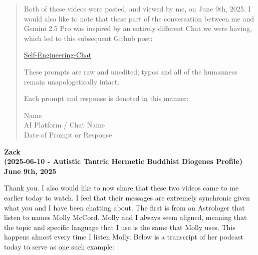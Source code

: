 \documentclass{article}
\begin{document}
\begin{titlepage}
\begin{abstract}
\medskip

Both of these videos were posted, and viewed by me, on June 9th, 2025. I would also like to note that these part of the conversation between me and Gemini 2.5 Pro was inspired by an entirely different Chat we were having, which led to this subsequent Github post:

\medskip

\href{https://github.com/whitelotusapps/Gemini-2.5-Pro-Preview/blob/main/README.md}{Self-Engineering-Chat}

\medskip

These prompts are raw and unedited; typos and all of the humanness remain unapologetically intact.

\medskip

Each prompt and response is denoted in this manner:

\medskip 

\begin{center}
Name \\
AI Platform / Chat Name \\
Date of Prompt or Response
\end{center}

\end{abstract}
\end{titlepage}

\begin{center}
\textbf{Zack} \\
\textbf{(2025-06-10 - Autistic Tantric Hermetic Buddhist Diogenes Profile)} \\
\textbf{June 9th, 2025}
\end{center}

\medskip

Thank you. I also would like to now share that these two videos came to
me earlier today to watch. I feel that their messages are extremely
synchronic given what you and I have been chatting about. The first is
from an Astrologer that listen to names Molly McCord. Molly and I always
seem aligned, meaning that the topic and specific language that I use is
the same that Molly uses. This happens almost every time I listen Molly.
Below is a transcript of her podcast today to serve as one such example:
\end{document}
